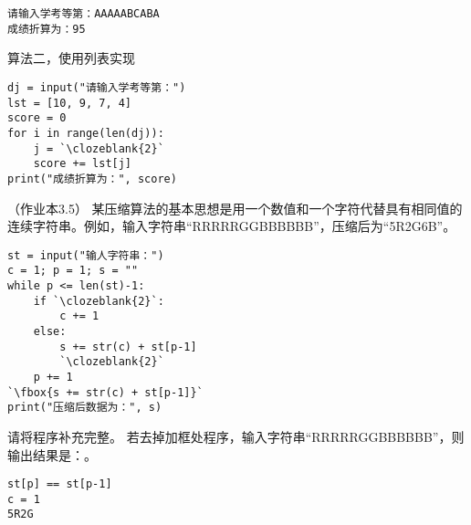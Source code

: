 \begin{groups}
\begin{questions}[rp]
\begin{subquestions}
\begin{paracol}{2}
\begin{lstlisting}[frame=single]
请输入学考等第：AAAAABCABA
成绩折算为：95
\end{lstlisting}

\end{paracol}

\subquestion 算法二，使用列表实现
\begin{lstlisting}
dj = input("请输入学考等第：")
lst = [10, 9, 7, 4]
score = 0
for i in range(len(dj)):
    j = `\clozeblank{2}`
    score += lst[j]
print("成绩折算为：", score)
\end{lstlisting}

\end{subquestions}


\setcounter{qnumber}{1}
\question （{\kaishu 作业本3.5}）
某压缩算法的基本思想是用一个数值和一个字符代替具有相同值的连续字符串。例如，输入字符串“RRRRRGGBBBBBB”，压缩后为“5R2G6B”。
\begin{lstlisting}
st = input("输人字符串：")
c = 1; p = 1; s = ""
while p <= len(st)-1:
    if `\clozeblank{2}`:
        c += 1
    else:
        s += str(c) + st[p-1]
        `\clozeblank{2}`
    p += 1
`\fbox{s += str(c) + st[p-1]}`
print("压缩后数据为：", s)

\end{lstlisting}


\begin{subquestions}
\subquestion 请将程序补充完整。
\subquestion 若去掉加框处程序，输入字符串“RRRRRGGBBBBBB”，则输出结果是：。
\end{subquestions}

\begin{solution}
\begin{lstlisting}
st[p] == st[p-1]
c = 1
5R2G
\end{lstlisting}
\end{solution}










\end{questions}
\end{groups}
